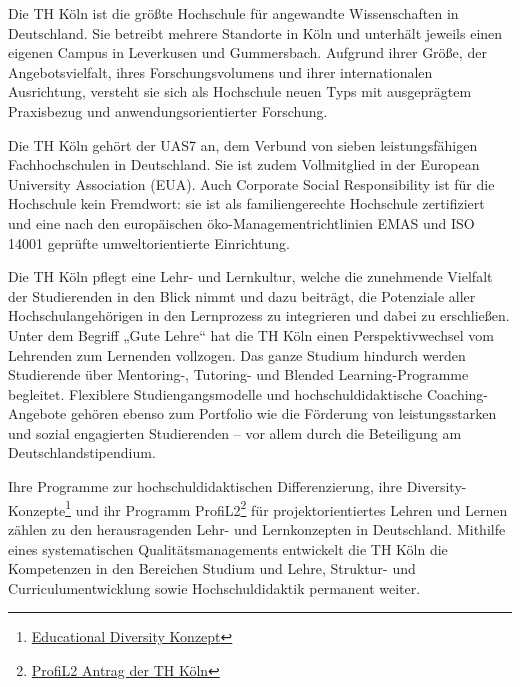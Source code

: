 Die TH Köln ist die größte Hochschule für angewandte Wissenschaften in
Deutschland. Sie betreibt mehrere Standorte in Köln und unterhält
jeweils einen eigenen Campus in Leverkusen und Gummersbach. Aufgrund
ihrer Größe, der Angebotsvielfalt, ihres Forschungsvolumens und ihrer
internationalen Ausrichtung, versteht sie sich als Hochschule neuen Typs
mit ausgeprägtem Praxisbezug und anwendungsorientierter Forschung.

Die TH Köln gehört der UAS7 an, dem Verbund von sieben leistungsfähigen
Fachhochschulen in Deutschland. Sie ist zudem Vollmitglied in der
European University Association (EUA). Auch Corporate Social
Responsibility ist für die Hochschule kein Fremdwort: sie ist als
familiengerechte Hochschule zertifiziert und eine nach den europäischen
öko-Managementrichtlinien EMAS und ISO 14001 geprüfte umweltorientierte
Einrichtung.

Die TH Köln pflegt eine Lehr- und Lernkultur, welche die zunehmende
Vielfalt der Studierenden in den Blick nimmt und dazu beiträgt, die
Potenziale aller Hochschulangehörigen in den Lernprozess zu integrieren
und dabei zu erschließen. Unter dem Begriff „Gute Lehre`` hat die TH
Köln einen Perspektivwechsel vom Lehrenden zum Lernenden vollzogen. Das
ganze Studium hindurch werden Studierende über Mentoring-, Tutoring- und
Blended Learning-Programme begleitet. Flexiblere Studiengangsmodelle und
hochschuldidaktische Coaching-Angebote gehören ebenso zum Portfolio wie
die Förderung von leistungsstarken und sozial engagierten Studierenden
-- vor allem durch die Beteiligung am Deutschlandstipendium.

Ihre Programme zur hochschuldidaktischen Differenzierung, ihre
Diversity-Konzepte\footnote{\href{https://www.th-koeln.de/hochschule/educational-diversity_5710.php}{Educational
  Diversity Konzept}} und ihr Programm ProfiL2\footnote{\href{https://www.th-koeln.de/mam/downloads/deutsch/hochschule/profil/lehre/profil2_antrag_ministerium.pdf}{ProfiL2
  Antrag der TH Köln}} für projektorientiertes Lehren und Lernen zählen
zu den herausragenden Lehr- und Lernkonzepten in Deutschland. Mithilfe
eines systematischen Qualitätsmanagements entwickelt die TH Köln die
Kompetenzen in den Bereichen Studium und Lehre, Struktur- und
Curriculumentwicklung sowie Hochschuldidaktik permanent weiter.

